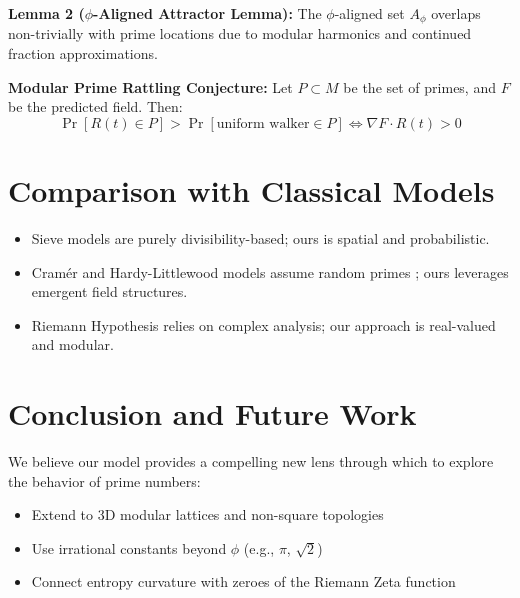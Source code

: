\documentclass[12pt]{article}
\begin{document}
\textbf{Lemma 2 ($\phi$-Aligned Attractor Lemma):}
The $\phi$-aligned set $A_\phi$ overlaps non-trivially with prime locations due to modular harmonics and continued fraction approximations.

\textbf{Modular Prime Rattling Conjecture:}
Let $P \subset M$ be the set of primes, and $F$ be the predicted field. Then:
\[ \Pr[R(t) \in P] > \Pr[\text{uniform walker} \in P] \iff \nabla F \cdot R(t) > 0 \]

\section{Comparison with Classical Models}
\begin{itemize}
    \item Sieve models are purely divisibility-based; ours is spatial and probabilistic.
    \item Cram\'er and Hardy-Littlewood models assume random primes \cite{hardy2008introduction, granville1995unexpected}; ours leverages emergent field structures.
    \item Riemann Hypothesis relies on complex analysis; our approach is real-valued and modular.
\end{itemize}

\section{Conclusion and Future Work}
We believe our model provides a compelling new lens through which to explore the behavior of prime numbers:
\begin{itemize}
    \item Extend to 3D modular lattices and non-square topologies
    \item Use irrational constants beyond $\phi$ (e.g., $\pi$, $\sqrt{2}$)
    \item Connect entropy curvature with zeroes of the Riemann Zeta function
\end{itemize}



\end{document}
